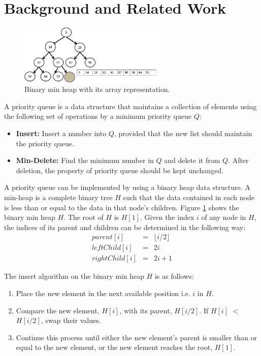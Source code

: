 \section{Background and Related Work}
\label{s:background}

\begin{figure}[!ht]
  \centering
  \includegraphics[width=7cm]{fig/fig2.png}
      \caption{Binary min heap with its array representation.}
    \label{fig2}
\end{figure}

A priority queue is a data structure that maintains a collection of elements using the following set of operations by a minimum priority queue $Q$:
\begin{itemize}
\item {\bf Insert:} Insert a number into $Q$, provided that the new list should maintain the priority queue.
\item {\bf Min-Delete:} Find the minimum number in $Q$ and delete it from $Q$. After deletion, the property of priority queue should be kept unchanged.
\end{itemize}

A priority queue can be implemented by using a binary heap data structure.
A min-heap is a complete binary tree $H$ such that the data contained in each node is less than or equal to the data in that node's children.
Figure \ref{fig2} shows the binary min heap $H$.
The root of $H$ is $H[1]$.
Given the index $i$ of any node in $H$, the indices of its parent and children can be determined in the following way:
\begin{eqnarray*}
parent[i] &=&  \lfloor i/2 \rfloor \\
leftChild[i] &=& 2i\\
rightChild[i] &=& 2i + 1
\end{eqnarray*}

The insert algorithm on the binary min heap $H$ is as follows:
\begin{enumerate}
\item Place the new element in the next available position i.e. $i$ in $H$.
\item Compare the new element, $H[i]$, with its parent, $H[i/2]$. If $H[i]$ $<$ $H[i/2]$, swap their values.
\item Continue this process until either the new element's parent is smaller than or equal to the new element, or the new element reaches the root, $H[1]$.
\end{enumerate}

